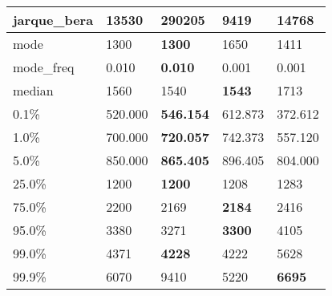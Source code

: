 \begin{table}[H]
\begin{tabular}{|l|m{10em}|m{10em}|m{10em}|m{10em}|}
\hline jarque\_bera & 13530 & \cellcolor[rgb]{0.9, 0.54, 0.52} 290205 & 9419 & \bfseries 14768 \\
\hline mode & 1300 & \bfseries 1300 & \cellcolor[rgb]{0.9, 0.54, 0.52} 1650 & 1411 \\
\hline mode\_freq & 0.010 & \bfseries 0.010 & \cellcolor[rgb]{0.9, 0.54, 0.52} 0.001 & 0.001 \\
\hline median & 1560 & 1540 & \bfseries 1543 & \cellcolor[rgb]{0.9, 0.54, 0.52} 1713 \\
\hline 0.1\% & 520.000 & \bfseries 546.154 & 612.873 & \cellcolor[rgb]{0.9, 0.54, 0.52} 372.612 \\
\hline 1.0\% & 700.000 & \bfseries 720.057 & 742.373 & \cellcolor[rgb]{0.9, 0.54, 0.52} 557.120 \\
\hline 5.0\% & 850.000 & \bfseries 865.405 & \cellcolor[rgb]{0.9, 0.54, 0.52} 896.405 & 804.000 \\
\hline 25.0\% & 1200 & \bfseries 1200 & 1208 & \cellcolor[rgb]{0.9, 0.54, 0.52} 1283 \\
\hline 75.0\% & 2200 & 2169 & \bfseries 2184 & \cellcolor[rgb]{0.9, 0.54, 0.52} 2416 \\
\hline 95.0\% & 3380 & 3271 & \bfseries 3300 & \cellcolor[rgb]{0.9, 0.54, 0.52} 4105 \\
\hline 99.0\% & 4371 & \bfseries 4228 & 4222 & \cellcolor[rgb]{0.9, 0.54, 0.52} 5628 \\
\hline 99.9\% & 6070 & \cellcolor[rgb]{0.9, 0.54, 0.52} 9410 & 5220 & \bfseries 6695 \\
\hline
\end{tabular}
\end{table}
